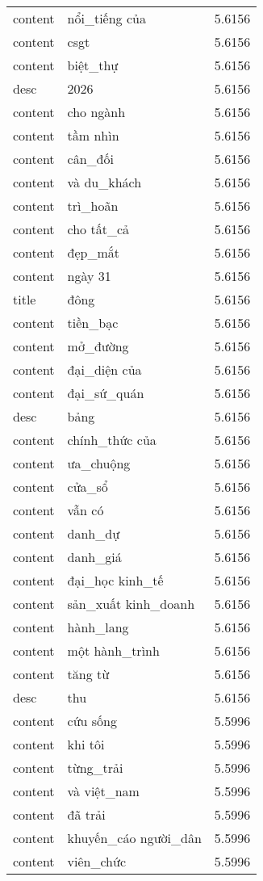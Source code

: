\documentclass{article}
\begin{document}
\begin{tabular}{lll}
content & nổi\_tiếng của & 5.6156\\
content & csgt & 5.6156\\
content & biệt\_thự & 5.6156\\
desc & 2026 & 5.6156\\
content & cho ngành & 5.6156\\
content & tầm nhìn & 5.6156\\
content & cân\_đối & 5.6156\\
content & và du\_khách & 5.6156\\
content & trì\_hoãn & 5.6156\\
content & cho tất\_cả & 5.6156\\
content & đẹp\_mắt & 5.6156\\
content & ngày 31 & 5.6156\\
title & đông & 5.6156\\
content & tiền\_bạc & 5.6156\\
content & mở\_đường & 5.6156\\
content & đại\_diện của & 5.6156\\
content & đại\_sứ\_quán & 5.6156\\
desc & bảng & 5.6156\\
content & chính\_thức của & 5.6156\\
content & ưa\_chuộng & 5.6156\\
content & cửa\_sổ & 5.6156\\
content & vẫn có & 5.6156\\
content & danh\_dự & 5.6156\\
content & danh\_giá & 5.6156\\
content & đại\_học kinh\_tế & 5.6156\\
content & sản\_xuất kinh\_doanh & 5.6156\\
content & hành\_lang & 5.6156\\
content & một hành\_trình & 5.6156\\
content & tăng từ & 5.6156\\
desc & thu & 5.6156\\
content & cứu sống & 5.5996\\
content & khi tôi & 5.5996\\
content & từng\_trải & 5.5996\\
content & và việt\_nam & 5.5996\\
content & đã trải & 5.5996\\
content & khuyến\_cáo người\_dân & 5.5996\\
content & viên\_chức & 5.5996\\

\end{tabular}
\end{document}
